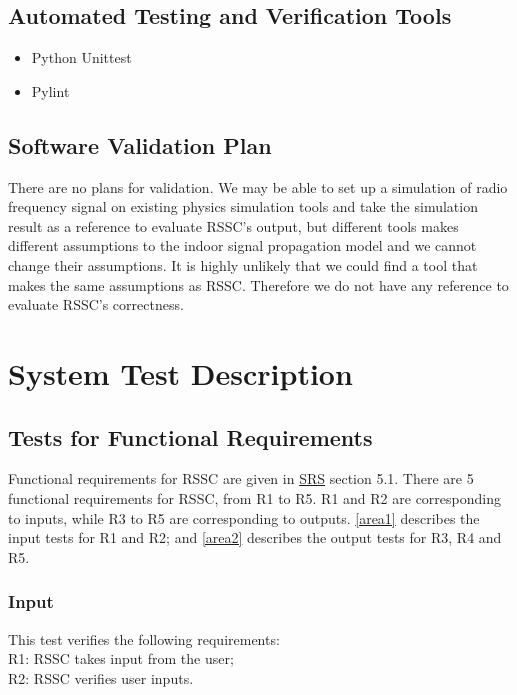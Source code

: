 \documentclass[12pt, titlepage]{article}
\begin{document}
\subsection{Automated Testing and Verification Tools}
\begin{itemize}
	\item Python Unittest
\end{itemize}
\begin{itemize}
	\item Pylint
\end{itemize}

\subsection{Software Validation Plan}

There are no plans for validation. We may be able to set up a simulation of radio
frequency signal on existing physics simulation tools and take the simulation 
result as a reference to evaluate RSSC's output, but different tools makes 
different assumptions to the indoor signal propagation model and we cannot 
change their assumptions. It is highly unlikely that we could find a tool 
that makes the same assumptions as RSSC. Therefore we do not have any reference 
to evaluate RSSC's correctness.


\section{System Test Description}
\label{systd}
	
\subsection{Tests for Functional Requirements}
\label{tfr}

Functional requirements for RSSC are given in 
\href{https://github.com/XingzhiMac/CAS741-Proj/blob/master/docs/SRS/SRS.pdf}
{SRS} section 5.1. There are 5 functional requirements for RSSC, from R1 to R5.
R1 and R2 are corresponding to inputs, while R3 to R5 are corresponding to outputs.
\autoref{area1} describes the input tests for R1 and R2; and \autoref{area2} 
describes the output tests for R3, R4 and R5.

\subsubsection{Input}\label{Ainput}
\label{area1}

This test verifies the following requirements: \\
\indent  R1: RSSC takes input from the user;\\
\indent  R2: RSSC verifies user inputs.\\
		
\end{document}
